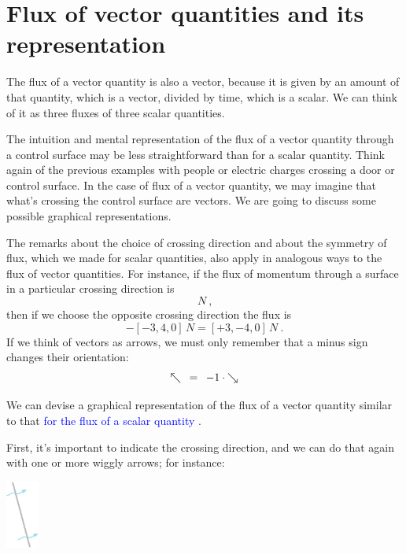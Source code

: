 \documentclass[a4paper,12pt,%
onecolumn,oneside,%
british%
]{memoir}
\renewcommand*{\|}[1][]{\nonscript\:#1\vert\nonscript\:\mathopen{}}
\newcommand*{\sect}{\S}%
\renewcommand*{\autoref}[3][\sect\,\ref]{\textcolor{blue}{#3}
\raisebox{0.6ex}{\color{blue}\miniscule%
\faIcon{angle-right}%
\;#1{#2}\;p.\,\pageref{#2}}}
\begin{document}
\section{Flux of vector quantities and its representation}
\label{sec:intuition_fluxes_vector}

The flux of a vector quantity is also a vector, because it is given by an amount of that quantity, which is a vector, divided by time, which is a scalar. We can think of it as three fluxes of three scalar quantities.

The intuition and mental representation of the flux of a vector quantity through a control surface may be less straightforward than for a scalar quantity. Think again of the previous examples with people or electric charges crossing a door or control surface. In the case of flux of a vector quantity, we may imagine that what's crossing the control surface are vectors. We are going to discuss some possible graphical representations.

The remarks about the choice of crossing direction and about the symmetry of flux, which we made for scalar quantities, also apply in analogous ways to the flux of vector quantities. For instance, if the flux of momentum through a surface in a particular crossing direction is
\begin{equation*}
  [-3, 4, 0]\,\unit{N} \ ,
\end{equation*}
then if we choose the opposite crossing direction the flux is
\begin{equation*}
  -[-3, 4, 0]\,\unit{N} = [+3, -4, 0]\,\unit{N}\ .
\end{equation*}
If we think of vectors as arrows, we must only remember that a minus sign changes their orientation:\noprelistbreak
\begin{equation*}
  \mathord{\nwarrow} \mathrel{\enskip=\enskip} -1\cdot\mathord{\searrow}
\end{equation*}

\medskip

We can devise a graphical representation of the flux of a vector quantity similar to that \autoref{sec:flux_scalar_representation}{for the flux of a scalar quantity}.

First, it's important to indicate the crossing direction, and we can do that again with one or more wiggly arrows; for instance:\noprelistbreak
\begin{center}
  \medskip
  \includegraphics[height=6em]{images/surface_tilted_crossing.jpg}
\end{center}
\end{document}
